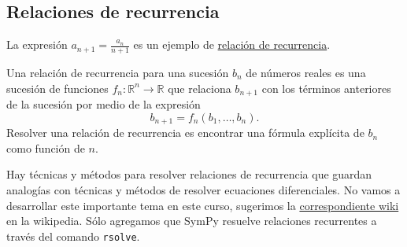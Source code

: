 \documentclass{article}
\newcommand{\rr}{\mathbb{R}}
\newcounter{ejemplo_cont}
\begin{document}
\subsection{Relaciones de recurrencia}

La expresión $a_{n+1}=\frac{a_{n}}{n+1}$ es un ejemplo de \href{http://es.wikipedia.org/wiki/Relación_de_recurrencia}{relación de recurrencia}.
\begin{definicion} Una  relación de recurrencia para una sucesión $b_n$ de números reales es una sucesión de 
funciones $f_n:\rr^n\to\rr$ que relaciona $b_{n+1}$ con los términos anteriores de la sucesión por medio de 
la expresión
\begin{equation}\label{eq:recu} b_{n+1}=f_n(b_1,\ldots,b_n).
\end{equation}
Resolver una relación de recurrencia es encontrar una fórmula explícita de $b_n$ como función de $n$.
 \end{definicion}


Hay técnicas y métodos para resolver relaciones de recurrencia que guardan analogías con técnicas y métodos de resolver ecuaciones diferenciales.  No vamos a desarrollar este importante tema en este curso, sugerimos la \href{http://es.wikipedia.org/wiki/Relación_de_recurrencia}{correspondiente wiki} en la wikipedia. Sólo agregamos que  SymPy resuelve relaciones recurrentes a través del comando \texttt{rsolve}. 
\end{document}

